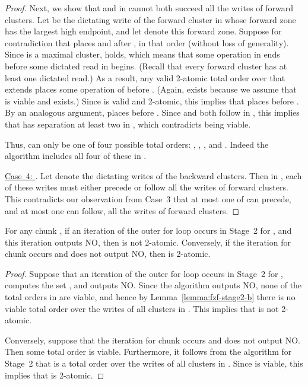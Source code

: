\begin{lemma}
\begin{proof}
Next, we show that  and  in  cannot both succeed all the writes of forward clusters.
Let  be the dictating write of the forward cluster in  whose forward zone has the largest high endpoint,
and let  denote this forward zone.
Suppose for contradiction that  places  and  after , in that order (without loss of generality).
Since  is a maximal cluster,  holds, which means that some operation in 
ends before some dictated read  in  begins.
(Recall that every forward cluster has at least one dictated read.)
As a result, any valid 2-atomic total order  over  that extends  places some operation of  before .  
(Again,  exists because we assume that  is viable and exists.)
Since  is valid and 2-atomic, this implies that  places  before .
By an analogous argument,  places  before .
Since  and  both follow  in , this implies that  has separation at least two in ,
which contradicts  being viable.

Thus,  can only be one of four possible total orders:
, , , and .
Indeed the algorithm includes all four of these in .

\noindent\underline{Case~4: }.
Let  denote the dictating writes of the backward clusters.
Then in , each of these writes must either precede or follow all the writes of forward clusters.
This contradicts our observation from Case~3 that at most one of  can precede,
and at most one can follow, all the writes of forward clusters.
\end{proof}
\end{lemma}

\begin{lemma}
\label{lemma:fzf-stage2-c}
For any chunk , if an iteration of the outer for loop occurs in Stage~2 for ,
and this iteration outputs NO, then  is not 2-atomic.
Conversely, if the iteration for chunk  occurs and does not output NO, then  is 2-atomic.
\begin{proof}
Suppose that an iteration of the outer for loop occurs in Stage~2 for , computes the set , and outputs NO.
Since the algorithm outputs NO, none of the total orders in  are viable, and hence by 
Lemma~\ref{lemma:fzf-stage2-b} there is no viable total order  over the writes of all clusters in .
This implies that  is not 2-atomic.

Conversely, suppose that the iteration for chunk  occurs and does not output NO.
Then some total order  is viable.
Furthermore, it follows from the algorithm for Stage~2 that  is a total order
over the writes of all clusters in .
Since  is viable, this implies that  is 2-atomic.
\end{proof}
\end{lemma}

